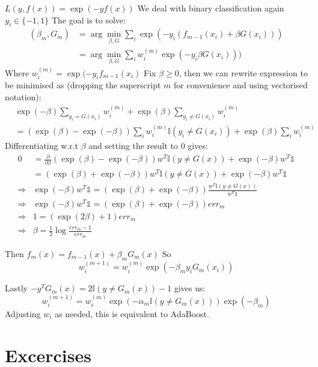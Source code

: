 $L(y, f(x)) = \exp(-y f(x))$
We deal with binary classification again $y_i \in \{-1,1\}$
The goal is to solve:
\begin{align*}
    (\beta_m, G_m) &= \arg\min_{\beta, G} \sum_i \exp(-y_i(f_{m-1}(x_i) + \beta G(x_i))) \\
     &= \arg\min_{\beta, G} \sum_i w_i^{(m)}\exp(-y_i \beta G(x_i))) 
\end{align*}
Where $w_i^{(m)} =  \exp(-y_i f_{m-1}(x_i)$
Fix $\beta \geq 0$, then we can rewrite expression to be minimised as (dropping the superscript $m$ for convenience and using vectorised notation):
\begin{align*}
    & \exp(-\beta) \sum_{y_i = G(x_i)} w_i^{(m)} + \exp(\beta) \sum_{y_i \neq G(x_i)} w_i^{(m)}\\
    &= \left(\exp(\beta) - \exp(-\beta)\right) \sum_{i} w_i^{(m)}\mathbb{I}\left(y_i \neq G(x_i)\right)+ \exp(\beta) \sum_{i} w_i^{(m)}
\end{align*}
Differentiating w.r.t $\beta$ and setting the result to $0$ gives:
\begin{align*}
   0 &= \frac{\partial }{\partial \beta} \left(\exp(\beta) - \exp(-\beta)\right) w^T\mathbb{I}(y \neq G(x)) + \exp(-\beta) w^T \mathbb{1} \\
   &= \left(\exp(\beta) + \exp(-\beta)\right) w^T\mathbb{I}(y \neq G(x)) + \exp(-\beta) w^T \mathbb{1} \\
    \Rightarrow&  \exp(-\beta) w^T \mathbb{1} = \left(\exp(\beta) + \exp(-\beta)\right) \frac{w^T\mathbb{I}(y \neq G(x))}{ w^T \mathbb{1}} \\
   \Rightarrow&  \exp(-\beta) w^T \mathbb{1}  = \left(\exp(\beta) + \exp(-\beta)\right) err_m \\
   \Rightarrow&  1 =  \left(\exp(2\beta) + 1 \right) err_m \\
   \Rightarrow&   \beta = \frac{1}{2} \log\frac{err_m - 1}{err_m} 
\end{align*}

Then $f_m(x) = f_{m-1}(x) + \beta_m G_m(x)$
So $$w_i^{(m+1)} = w_i^{(m)}  \exp\left(-\beta_m y_i G_m(x_i)\right)$$

Lastly $ -y^T G_m(x) = 2 \mathbb{I}\left(y \neq G_m(x)\right) - 1$ gives us:
$$w_i^{(m+1)} = w_i^{(m)}  \exp\left(-\alpha_m \mathbb{I}\left(y \neq G_m(x)\right) \right)\exp\left(
-\beta_m\right)$$
Adjusting $w_i$ as needed, this is equivalent to AdaBoost.


\section*{Excercises}
